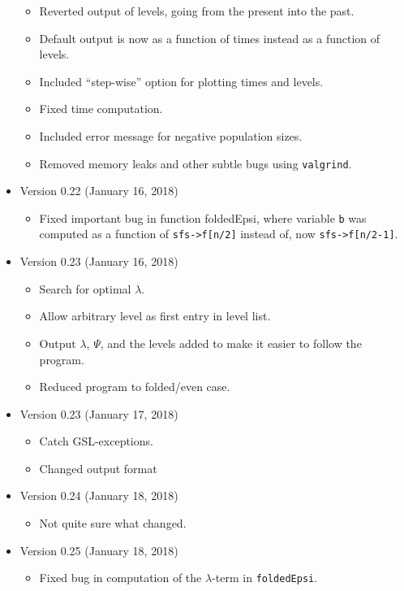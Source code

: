 \documentclass[a4paper]{article}
\newcommand{\ty}{\texttt}
\begin{document}
\begin{itemize}
\begin{itemize}
    \item Reverted output of levels, going from the present into the
      past.
    \item Default output is now as a function of times instead as a
      function of levels.
    \item Included ``step-wise'' option for plotting times and levels.
    \item Fixed time computation.
    \item Included error message for negative population sizes.
    \item Removed memory leaks and other subtle bugs using \ty{valgrind}.
  \end{itemize}
\item Version 0.22 (January 16, 2018)
  \begin{itemize}
    \item Fixed important bug in function foldedEpsi, where variable
      \ty{b} was computed as a function of \verb+sfs->f[n/2]+ instead
      of, now \verb+sfs->f[n/2-1]+.
  \end{itemize}
\item Version 0.23 (January 16, 2018)
  \begin{itemize}
  \item Search for optimal $\lambda$.
  \item Allow arbitrary level as first entry in level list.
  \item Output $\lambda$, $\Psi$, and the levels added to make it
    easier to follow the program.
  \item Reduced program to folded/even case.
  \end{itemize}
\item Version 0.23 (January 17, 2018)
  \begin{itemize}
  \item Catch GSL-exceptions.
  \item Changed output format
  \end{itemize}
\item Version 0.24 (January 18, 2018)
  \begin{itemize}
  \item Not quite sure what changed.
  \end{itemize}
\item Version 0.25 (January 18, 2018)
  \begin{itemize}
  \item Fixed bug in computation of the $\lambda$-term in
    \ty{foldedEpsi}.
  \end{itemize}

\end{itemize}
\end{document}
